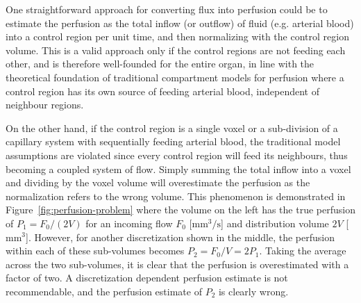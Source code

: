 \documentclass[final,5p,times,twocolumn]{elsarticle}
\begin{document}
	One straightforward approach for converting flux into perfusion could be to estimate the perfusion as the total inflow (or outflow) of fluid (e.g. arterial blood) into a control region per unit time, and then normalizing with the control region volume. 
	This is a valid approach only if the control regions are not feeding each other, and is therefore well-founded for the entire organ,
	in line with the theoretical foundation of traditional compartment models for perfusion where a control region has its own source of feeding arterial blood, independent of neighbour regions. 

	On the other hand, if the control region is a single voxel or a sub-division of a capillary system with sequentially feeding arterial blood, the traditional model assumptions are violated since every control region will feed its neighbours, thus becoming a coupled system of flow. 
	Simply summing the total inflow into a voxel and dividing by the voxel volume will overestimate the perfusion as the normalization refers to the wrong volume. 
	This phenomenon is demonstrated in Figure~\ref{fig:perfusion-problem} where the volume on the left has the true perfusion of $P_{1} = F_0 /(2V)$ for an incoming flow $F_0$ [$\si{\milli\meter\cubed\per\second}$] and distribution volume $2V$ [$\si{\milli\meter\cubed}$]. 
	However, for another discretization shown in the middle, the perfusion within each of these sub-volumes becomes $P_{2} = F_0/V = 2P_{1}$. 
	Taking the average across the two sub-volumes, it is clear that the perfusion is overestimated with a factor of two. 
	A discretization dependent perfusion estimate is not recommendable, and the perfusion estimate of $P_{2}$ is clearly wrong. 
\end{document}
